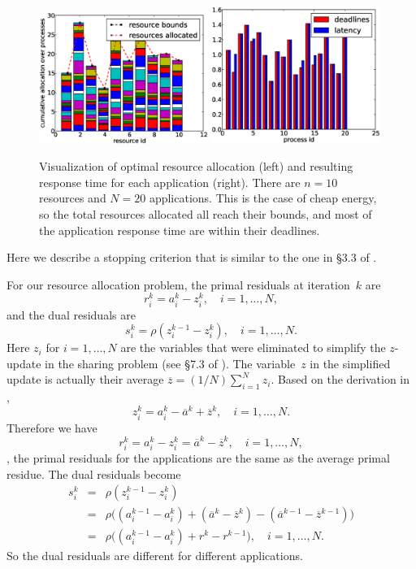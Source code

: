 \begin{figure}[th]
\centering
\includegraphics[width=0.49\textwidth]{figures/test_resource_c.eps}
\includegraphics[width=0.49\textwidth]{figures/test_latency_c.eps}
\caption{Visualization of optimal resource allocation (left) and 
    resulting response time for each application (right).
    There are $n=10$ resources and $N=20$ applications.
    This is the case of cheap energy, so the total resources allocated
    all reach their bounds, and most of the application response time are 
within their deadlines.}
\label{fig:allocation-c}
\end{figure}

Here we describe a stopping criterion that is similar to the one
in \S3.3 of \cite{ADMM}.

For our resource allocation problem, the primal residuals at iteration~$k$ are
\[
    r_i^k = a_i^k - z_i^k, \quad i=1,\ldots,N,
\]
and the dual residuals are
\[
    s_i^k = \rho (z_i^{k-1}-z_i^{k}), \quad i=1,\ldots,N.
\]
Here $z_i$ for $i=1,\ldots, N$ are the variables that were eliminated
to simplify the $z$-update in the sharing problem 
(see \S7.3 of \cite{ADMM}).
The variable~$z$ in the  simplified update is actually 
their average $\overline z=(1/N)\sum_{i=1}^N z_i$.
Based on the derivation in \cite[\S7.3]{ADMM}, 
\[
    z_i^k = a_i^k -\overline a^k + \overline z^k , \quad i=1,\ldots,N.
\]
Therefore we have
\[
    r_i^k = a_i^k - z_i^k = \overline a^k - \overline z^k, \quad i=1,\ldots,N,
\]
\ie, the primal residuals for the applications are the same as the average
primal residue.
The dual residuals become
\begin{eqnarray*}
    s_i^k &=& \rho(z_i^{k-1} - z_i^k) \\
    &=&\rho\bigl( (a_i^{k-1}-a_i^k) +(\overline a^k-\overline z^k)
    -(\overline a^{k-1} - \overline z^{k-1})\bigr)\\
    &=& \rho\bigl( (a_i^{k-1}-a_i^k) + r^k - r^{k-1} \bigr),
    \quad i=1,\ldots, N.
\end{eqnarray*}
So the dual residuals are different for different applications.

